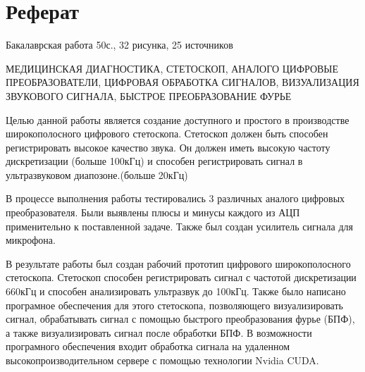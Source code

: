 \documentclass[../paper.tex]{subfiles}
\begin{document}
\newpage
\section*{\centering Реферат}

\par\noindent Бакалаврская работа 50с., 32 рисунка, 25 источников

МЕДИЦИНСКАЯ ДИАГНОСТИКА, СТЕТОСКОП, АНАЛОГО ЦИФРОВЫЕ ПРЕОБРАЗОВАТЕЛИ, ЦИФРОВАЯ ОБРАБОТКА СИГНАЛОВ, ВИЗУАЛИЗАЦИЯ ЗВУКОВОГО СИГНАЛА, БЫСТРОЕ ПРЕОБРАЗОВАНИЕ ФУРЬЕ

Целью данной работы является создание доступного и простого в производстве широкополосного цифрового стетоскопа. Стетоскоп должен быть способен регистрировать высокое качество звука. Он должен иметь высокую частоту дискретизации (больше 100кГц) и способен регистрировать сигнал в ультразвуковом диапозоне.(больше 20кГц)

В процессе выполнения работы тестировались 3 различных аналого цифровых преобразователя. Были выявлены плюсы и минусы каждого из АЦП применительно к поставленной задаче. Также был создан усилитель сигнала для микрофона.

В результате работы был создан рабочий прототип цифрового широкополосного стетоскопа. Стетоскоп способен регистрировать сигнал с частотой дискретизации 660кГц и способен анализировать ультразвук до 100кГц. Также было написано програмное обеспечения для этого стетоскопа, позволяющего визуализировать сигнал, обрабатывать сигнал с помощью быстрого преобразования фурье (БПФ), а также визуализировать сигнал после обработки БПФ. В возможности програмного обеспечения входит обработка сигнала на удаленном высокопроизводительном сервере с помощью технологии Nvidia CUDA.

\clearpage
\normalsize
\end{document}

